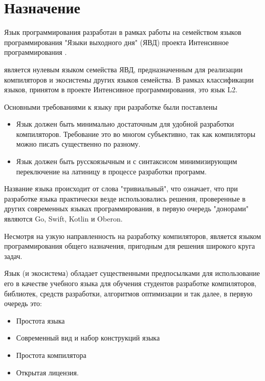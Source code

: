 \hypertarget{target}{
\section{Назначение}\label{target:chapter}}

Язык программирования \thelang{} разработан в рамках работы на семейством языков программирования "Языки выходного дня"  (ЯВД) \needlink{} проекта Интенсивное программирования \needlink{}.

\thelang{} является нулевым языком семейства ЯВД, предназначенным для реализации компиляторов и экосистемы других языков семейства. В рамках классификации языков, принятом в проекте Интенсивное программирования, это язык L2.


Основными требованиями к языку при разработке были поставлены
\begin{itemize}
\item 
    Язык должен быть минимально достаточным для удобной разработки компиляторов. Требование это во многом субъективно, так как компиляторы можно писать существенно по разному.
\item 
    Язык должен быть русскоязычным и с синтаксисом минимизирующим переключение на латиницу в процессе разработки программ.
\end{itemize}

Название языка происходит от слова "тривиальный", что означает, что при разработке языка практически везде использовались решения, проверенные в других современных языках программирования, в первую очередь "донорами" являются Go, Swift, Kotlin и Oberon.

Несмотря на узкую направленность на разработку компиляторов, \thelang{} является языком программирования общего назначения, пригодным для решения широкого круга задач.

Язык (и экосистема) обладает существенными предпосылками для использование его в качестве учебного языка для обучения студентов разработке компиляторов, библиотек, средств разработки, алгоритмов оптимизации и так далее, в первую очередь это:
\begin{itemize}
\item 
    Простота языка
\item 
    Современный вид и набор конструкций языка
\item 
    Простота компилятора
\item 
    Открытая лицензия.
\end{itemize}

